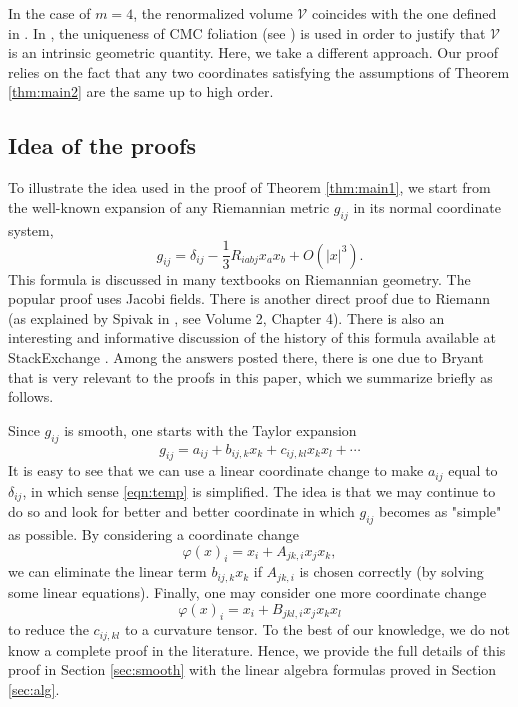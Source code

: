 \documentclass{amsart}
\newcommand{\abs}[1]{\left\vert#1\right\vert}
\numberwithin{equation}{section}
\begin{document}
In the case of $m=4$, the renormalized volume $\mathcal V$ coincides with the one defined in \cite{biquard2023renormalized}. In \cite{biquard2023renormalized}, the uniqueness of CMC foliation (see \cite{chodosh2017}) is used in order to justify that $\mathcal V$ is an intrinsic geometric quantity. Here, we take a different approach. Our proof relies on the fact that any two coordinates satisfying the assumptions of Theorem \ref{thm:main2} are the same up to high order.

\subsection{Idea of the proofs}

To illustrate the idea used in the proof of Theorem \ref{thm:main1}, we start from the well-known expansion of any Riemannian metric $g_{ij}$ in its normal coordinate system,
\[
	g_{ij}=\delta_{ij}-\frac{1}{3}R_{iabj}x_ax_b + O(\abs{x}^3).
\]
This formula is discussed in many textbooks on Riemannian geometry. The popular proof uses Jacobi fields. There is another direct proof due to Riemann (as explained by Spivak in \cite{spivak1979}, see Volume 2, Chapter 4). There is also an interesting and informative discussion of the history of this formula available at StackExchange \cite{web}. Among the answers posted there, there is one due to Bryant that is very relevant to the proofs in this paper, which we summarize briefly as follows.

Since $g_{ij}$ is smooth, one starts with the Taylor expansion
\begin{equation}
	\label{eqn:temp}
	g_{ij}=a_{ij}+b_{ij,k}x_k+ c_{ij,kl}x_kx_l + \cdots 
\end{equation}
It is easy to see that we can use a linear coordinate change to make $a_{ij}$ equal to $\delta_{ij}$, in which sense \eqref{eqn:temp} is simplified. The idea is that we may continue to do so and look for better and better coordinate in which $g_{ij}$ becomes as "simple" as possible. By considering a coordinate change
\[
	\varphi(x)_i = x_i + A_{jk,i}x_jx_k,
\]
we can eliminate the linear term $b_{ij,k}x_k$ if $A_{jk,i}$ is chosen correctly (by solving some linear equations). Finally, one may consider one more coordinate change
\[
	\varphi(x)_i=x_i + B_{jkl,i}x_jx_kx_l
\]
to reduce the $c_{ij,kl}$ to a curvature tensor. To the best of our knowledge, we do not know a complete proof in the literature. Hence, we provide the full details of this proof in Section \ref{sec:smooth} with the linear algebra formulas proved in Section \ref{sec:alg}.
\end{document}
